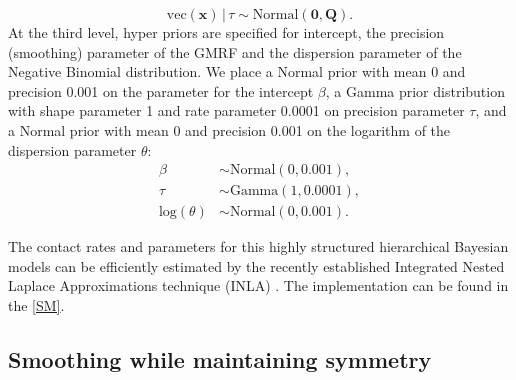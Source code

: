 \documentclass[aoas,preprint]{imsart}
\numberwithin{equation}{section}
\begin{document}
\begin{equation}\label{eq:2.6}
\text{vec}(\bm{x}) \, | \, \tau \sim \text{Normal}(\bm{0},\bm{Q}).
\end{equation}
At the third level, hyper priors are specified for intercept, the precision (smoothing) parameter of the GMRF and the dispersion parameter of the Negative Binomial distribution. We place a Normal prior with mean 0 and precision 0.001 on the parameter for the intercept $\beta$, a Gamma prior distribution with shape parameter 1 and rate parameter 0.0001 on precision parameter $\tau$, and a Normal prior with mean 0 and precision 0.001 on the logarithm of the dispersion parameter $\theta$:
\begin{align}\label{eq:2.789}
\beta &\sim \text{Normal}(0, 0.001),\\
\tau &\sim \text{Gamma}(1, 0.0001),\\
\text{log}⁡(\theta) &\sim \text{Normal}(0, 0.001).
\end{align}

The contact rates and parameters for this highly structured hierarchical Bayesian models can be efficiently estimated by the recently established Integrated Nested Laplace Approximations technique (INLA) \citep{rue_approximate_2009}. The implementation can be found in the \ref{SM}.

\subsection{Smoothing while maintaining symmetry}
\end{document}
